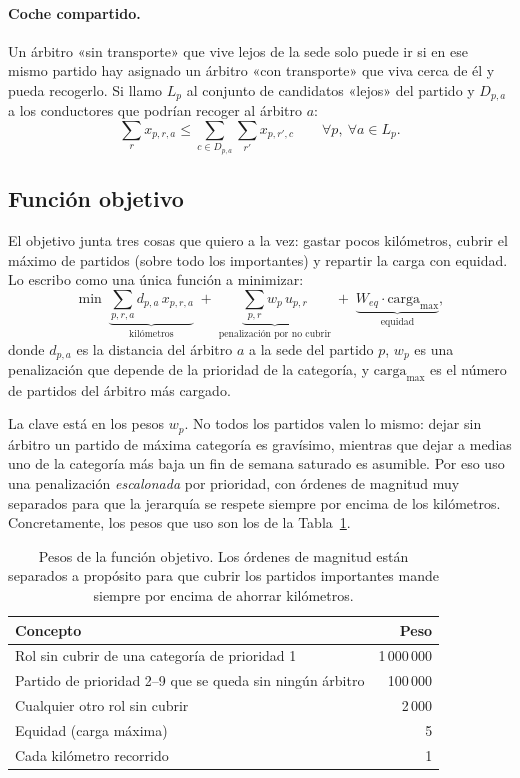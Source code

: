 \documentclass[11pt,a4paper,spanish]{book}
\numberwithin{equation}{chapter}
\numberwithin{figure}{chapter}
\numberwithin{table}{chapter}
\newcommand{\fuente}[1]{\par\vspace{2pt}{\footnotesize\textit{Fuente: #1}}}
\begin{document}
\paragraph{Coche compartido.} Un árbitro «sin transporte» que vive lejos de la sede solo puede ir si en ese mismo partido hay asignado un árbitro «con transporte» que viva cerca de él y pueda recogerlo. Si llamo $L_{p}$ al conjunto de candidatos «lejos» del partido y $D_{p,a}$ a los conductores que podrían recoger al árbitro $a$:
\begin{equation}
\sum_{r} x_{p,r,a} \le \sum_{c \in D_{p,a}} \sum_{r'} x_{p,r',c} \qquad \forall p, \ \forall a \in L_{p}.
\end{equation}

\subsection{Función objetivo}

El objetivo junta tres cosas que quiero a la vez: gastar pocos kilómetros, cubrir el máximo de partidos (sobre todo los importantes) y repartir la carga con equidad. Lo escribo como una única función a minimizar:
\begin{equation}
\min \ \underbrace{\sum_{p,r,a} d_{p,a}\, x_{p,r,a}}_{\text{kilómetros}} \;+\; \underbrace{\sum_{p,r} w_{p}\, u_{p,r}}_{\text{penalización por no cubrir}} \;+\; \underbrace{W_{eq}\cdot \text{carga}_{\max}}_{\text{equidad}},
\label{eq:objetivo}
\end{equation}
donde $d_{p,a}$ es la distancia del árbitro $a$ a la sede del partido $p$, $w_p$ es una penalización que depende de la prioridad de la categoría, y $\text{carga}_{\max}$ es el número de partidos del árbitro más cargado.

La clave está en los pesos $w_p$. No todos los partidos valen lo mismo: dejar sin árbitro un partido de máxima categoría es gravísimo, mientras que dejar a medias uno de la categoría más baja un fin de semana saturado es asumible. Por eso uso una penalización \emph{escalonada} por prioridad, con órdenes de magnitud muy separados para que la jerarquía se respete siempre por encima de los kilómetros. Concretamente, los pesos que uso son los de la Tabla~\ref{tab:pesos}.

\begin{table}[ht]
\centering
\caption{Pesos de la función objetivo. Los órdenes de magnitud están separados a propósito para que cubrir los partidos importantes mande siempre por encima de ahorrar kilómetros.}
\label{tab:pesos}
\begin{tabular}{@{}p{7.5cm}r@{}}
\toprule
{\bf Concepto} & {\bf Peso} \\
\midrule
Rol sin cubrir de una categoría de prioridad 1 & 1\,000\,000 \\
Partido de prioridad 2--9 que se queda sin ningún árbitro & 100\,000 \\
Cualquier otro rol sin cubrir & 2\,000 \\
Equidad (carga máxima) & 5 \\
Cada kilómetro recorrido & 1 \\
\bottomrule
\end{tabular}
\fuente{elaboración propia.}
\end{table}
\end{document}
